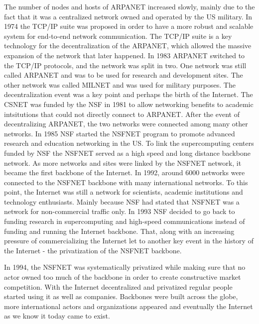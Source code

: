     The number of nodes and hosts of \gls{ARPANET} increased slowly, mainly due to the fact that it was a centralized network owned and operated by the \gls{US} military.
    In 1974 the \gls{TCP}/\gls{IP} suite was proposed in order to have a more robust and scalable system for end-to-end network communication.
    The \gls{TCP}/\gls{IP} suite is a key technology for the decentralization of the \gls{ARPANET}, which allowed the massive expansion of the network that later happened.
    In 1983 \gls{ARPANET} switched to the \gls{TCP}/\gls{IP} protocols, and the network was split in two.
    One network was still called \gls{ARPANET} and was to be used for research and development sites.
    The other network was called \gls{MILNET} and was used for military purposes.
    The decentralization event was a key point and perhaps the birth of the Internet.
    The \gls{CSNET} was funded by the \gls{NSF} in 1981 to allow networking benefits to academic intsitutions that could not directly connect to \gls{ARPANET}.
    After the event of decentralizing \gls{ARPANET}, the two networks were connected among many other networks.
    In 1985 \gls{NSF} started the \gls{NSFNET} program to promote advanced research and education networking in the \gls{US}.
    To link the supercomputing centers funded by \gls{NSF} the \gls{NSFNET} served as a high speed and long distance backbone network.
    As more networks and sites were linked by the \gls{NSFNET} network, it became the first backbone of the Internet.
    In 1992, around 6000 networks were connected to the \gls{NSFNET} backbone with many international networks.
    To this point, the Internet was still a network for scientists, academic institutions and technology enthusiasts.
    Mainly because \gls{NSF} had stated that \gls{NSFNET} was a network for non-commercial traffic only.
    In 1993 \gls{NSF} decided to go back to funding research in supercomputing and high-speed communications instead of funding and running the Internet backbone.
    That, along with an increasing pressure of commercializing the Internet let to another key event in the history of the Internet - the privatization of the \gls{NSFNET} backbone.

    In 1994, the \gls{NSFNET} was systematically privatized while making sure that no actor owned too much of the backbone in order to create constructive market competition.
    With the Internet decentralized and privatized regular people started using it as well as companies.
    Backbones were built across the globe, more international actors and organizations appeared and eventually the Internet as we know it today came to exist.

